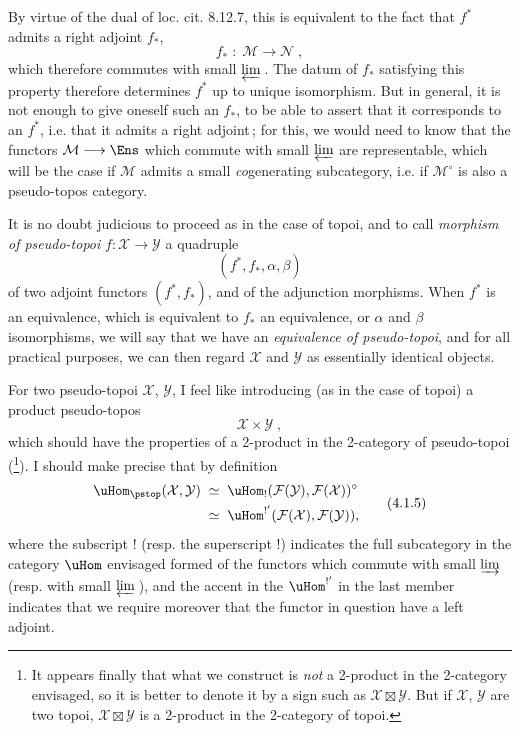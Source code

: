 By virtue of the dual of loc. cit. 8.12.7, this is equivalent to the fact that $f^*$ admits a right adjoint $f_*$,
\[
f_* \;:\; \mathcal{M} \longrightarrow \mathcal{N}\;,
\tag*{(4.1.2)}
\]
which therefore commutes with small $\varprojlim$\,. The datum of $f_*$ satisfying this property therefore determines $f^*$ up to unique isomorphism. But in general, it is not enough to give oneself such an $f_*$, to be able to assert that it corresponds to an $f^*$, i.e. that it admits a right adjoint\,; for this, we would need to know that the functors $\mathcal{M}\longrightarrow\Ens$ which commute with small $\varprojlim$ are representable, which will be the case if $\mathcal{M}$ admits a small \textit{co}generating subcategory, i.e. if $\mathcal{M}^\circ$ is also a pseudo-topos category. %

\newpage


It is no doubt judicious to proceed as in the case of topoi, and to call \textit{morphism of pseudo-topoi} $f:\mathcal{X}\longrightarrow\mathcal{Y}$ a quadruple
\[
(f^*,f_*,\alpha,\beta)
\tag*{(4.1.3)}
\]
of two adjoint functors $(f^*,f_*)$, and of the adjunction morphisms. When $f^*$ is an equivalence, which is equivalent to $f_*$ an equivalence, or $\alpha$ and $\beta$ isomorphisms, we will say that we have an \textit{equivalence of pseudo-topoi}, and for all practical purposes, we can then regard $\mathcal{X}$ and $\mathcal{Y}$ as essentially identical objects.

For two pseudo-topoi $\mathcal{X}$, $\mathcal{Y}$, I feel like introducing (as in the case of topoi) a product pseudo-topos
\[
\mathcal{X}\times\mathcal{Y}\;,
\tag*{(4.1.4)}
\]
which should have the properties of a 2-product in the 2-category of pseudo-topoi (\footnote{It appears finally that what we construct is \textit{not} a 2-product in the 2-category envisaged, so it is better to denote it by a sign such as $\mathcal{X}\boxtimes\mathcal{Y}$. But if $\mathcal{X}$, $\mathcal{Y}$ are two topoi, $\mathcal{X}\boxtimes\mathcal{Y}$ is a 2-product in the 2-category of topoi.}). I should make precise that by definition
\[
\begin{aligned}
\uHom_{\pstop}(\mathcal{X},\mathcal{Y}) \;&\simeq\; \uHom_!(\mathcal{F}(\mathcal{Y}),\mathcal{F}(\mathcal{X}))^\circ\\
&\simeq\; \uHom^{!'}(\mathcal{F}(\mathcal{X}),\mathcal{F}(\mathcal{Y})),
\end{aligned}
\tag*{(4.1.5)}
\]
where the subscript ! (resp. the superscript !) indicates the full subcategory in the category $\uHom$ envisaged formed of the functors which commute with small $\varinjlim$ (resp. with small
$\varprojlim$\,), and the accent in the $\uHom^{!'}$ in the last member indicates that we require moreover that the functor in question have a left adjoint.

